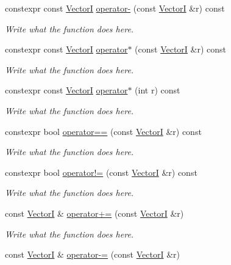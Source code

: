 \begin{DoxyCompactItemize}
constexpr const \hyperlink{structVectorI}{Vector\+I} \hyperlink{structVectorI_ac57b6fca8650441fb3a8144b4a080132}{operator-\/} (const \hyperlink{structVectorI}{Vector\+I} \&r) const 
\begin{DoxyCompactList}\small\item\em Write what the function does here. \end{DoxyCompactList}\item 
constexpr const \hyperlink{structVectorI}{Vector\+I} \hyperlink{structVectorI_ad82d24734f13434ec3fc61177ac1c042}{operator$\ast$} (const \hyperlink{structVectorI}{Vector\+I} \&r) const 
\begin{DoxyCompactList}\small\item\em Write what the function does here. \end{DoxyCompactList}\item 
constexpr const \hyperlink{structVectorI}{Vector\+I} \hyperlink{structVectorI_a3b7a75ee052063bc7798f34627241ef0}{operator$\ast$} (int r) const 
\begin{DoxyCompactList}\small\item\em Write what the function does here. \end{DoxyCompactList}\item 
constexpr bool \hyperlink{structVectorI_a6923b76ab9703c3318571b9570a0c7f6}{operator==} (const \hyperlink{structVectorI}{Vector\+I} \&r) const 
\begin{DoxyCompactList}\small\item\em Write what the function does here. \end{DoxyCompactList}\item 
constexpr bool \hyperlink{structVectorI_aab54353aaaac68e4c8ae223944dd09f1}{operator!=} (const \hyperlink{structVectorI}{Vector\+I} \&r) const 
\begin{DoxyCompactList}\small\item\em Write what the function does here. \end{DoxyCompactList}\item 
const \hyperlink{structVectorI}{Vector\+I} \& \hyperlink{structVectorI_af16ac9b6740a45ca43a9752cc9e40baa}{operator+=} (const \hyperlink{structVectorI}{Vector\+I} \&r)
\begin{DoxyCompactList}\small\item\em Write what the function does here. \end{DoxyCompactList}\item 
const \hyperlink{structVectorI}{Vector\+I} \& \hyperlink{structVectorI_ada96d53163f7b91fe105fae26787985f}{operator-\/=} (const \hyperlink{structVectorI}{Vector\+I} \&r)

\end{DoxyCompactItemize}

